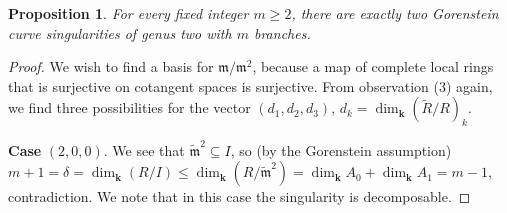 \documentclass[11pt]{amsart}
\renewcommand{\k}{\mathbf k}
\newcommand{\m}{\mathfrak m}
\newcommand{\tR}{\widetilde{R}}
\newcommand{\tm}{\widetilde{\mathfrak m}}
\theoremstyle{plain}
\newtheorem{prop}[thm]{Proposition}
\theoremstyle{definition}
\begin{document}
\begin{prop}\label{prop:classification}
 For every fixed integer $m\geq 2$, there are exactly two Gorenstein curve singularities of genus two with $m$ branches.
\end{prop}
\begin{proof}
 We wish to find a basis for $\m/\m^2$, because a map of complete local rings that is surjective on cotangent spaces is surjective. From observation (3) again, we find three possibilities for the vector $(d_1,d_2,d_3)$, $d_k=\dim_{\k}(\tR/R)_k$.
 
 \textbf{Case} $(2,0,0)$. We see that $\tm^2\subseteq I$, so (by the Gorenstein assumption) $m+1=\delta=\dim_\k(R/I)\leq \dim_\k(R/\tm^2)=\dim_\k A_0+\dim_\k A_1=m-1$, contradiction. We note that in this case the singularity is decomposable.
 

\end{proof}
\end{document}
